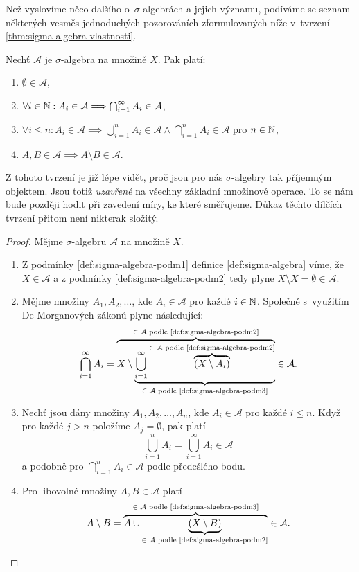 Než vyslovíme něco dalšího o~$\sigma$-algebrách a jejich významu, podíváme se seznam některých vesměs jednoduchých pozorováních zformulovaných níže v~tvrzení \ref{thm:sigma-algebra-vlastnosti}.
\begin{theorem}\label{thm:sigma-algebra-vlastnosti}
    Nechť $\mathcal{A}$ je $\sigma$-algebra na množině $X$. Pak platí:
    \begin{enumerate}[label=(\roman*)]
        \item $\emptyset\in\mathcal{A}$,
        \item $\forall i\in\mathbb{N}: A_i\in\mathcal{A}\Longrightarrow\bigcap_{i=1}^\infty A_i\in\mathcal{A}$,
        \item $\forall i\leqslant n: A_i\in\mathcal{A}\implies\bigcup_{i=1}^n A_i\in\mathcal{A}\land\bigcap_{i=1}^n A_i\in\mathcal{A}$ pro $n\in\mathbb{N}$,
        \item $A,B\in\mathcal{A}\implies A\setminus B\in\mathcal{A}$.
    \end{enumerate}
\end{theorem}

Z tohoto tvrzení je již lépe vidět, proč jsou pro nás $\sigma$-algebry tak příjemným objektem. Jsou totiž \emph{uzavřené} na všechny základní množinové operace. To se nám bude později hodit při zavedení míry, ke které směřujeme. Důkaz těchto dílčích tvrzení přitom není nikterak složitý.
\begin{proof}
    Mějme $\sigma$-algebru $\mathcal{A}$ na množině $X$.
    \begin{enumerate}[label=\textit{(\roman*)}]
        \item Z podmínky \ref{def:sigma-algebra-podm1} definice \ref{def:sigma-algebra} víme, že $X\in\mathcal{A}$ a z podmínky \ref{def:sigma-algebra-podm2} tedy plyne $X\setminus X=\emptyset\in\mathcal{A}$.
        \item Mějme množiny $A_1,A_2,\ldots$, kde $A_i\in\mathcal{A}$ pro každé $i\in\mathbb{N}$. Společně s~využitím De Morganových zákonů plyne následující:
        \[\bigcap\limits_{i=1}^\infty A_i=\overbrace{X\setminus\underbrace{\bigcup\limits_{i=1}^\infty \overbrace{(X\setminus A_i)}^{\text{$\in\mathcal{A}$ podle \ref{def:sigma-algebra-podm2}}}}_{\text{$\in\mathcal{A}$ podle \ref{def:sigma-algebra-podm3}}}}^\text{$\in\mathcal{A}$ podle \ref{def:sigma-algebra-podm2}}\in\mathcal{A}.\]
        \item Nechť jsou dány množiny $A_1,A_2,\dots,A_n$, kde $A_i\in\mathcal{A}$ pro každé $i\leqslant n$. Když pro každé $j>n$ položíme $A_j=\emptyset$, pak platí
        \[\bigcup\limits_{i=1}^n A_i=\bigcup\limits_{i=1}^\infty A_i\in\mathcal{A}\]
        a podobně pro $\bigcap_{i=1}^n A_i\in\mathcal{A}$ podle předešlého bodu.
        \item Pro libovolné množiny $A,B\in\mathcal{A}$ platí
        \[A\setminus B=\overbrace{A\cup\underbrace{(X\setminus B)}_{\text{$\in\mathcal{A}$ podle \ref{def:sigma-algebra-podm2}}}}^{\text{$\in\mathcal{A}$ podle \ref{def:sigma-algebra-podm3}}}\in\mathcal{A}.\]
    \end{enumerate}
\end{proof}

